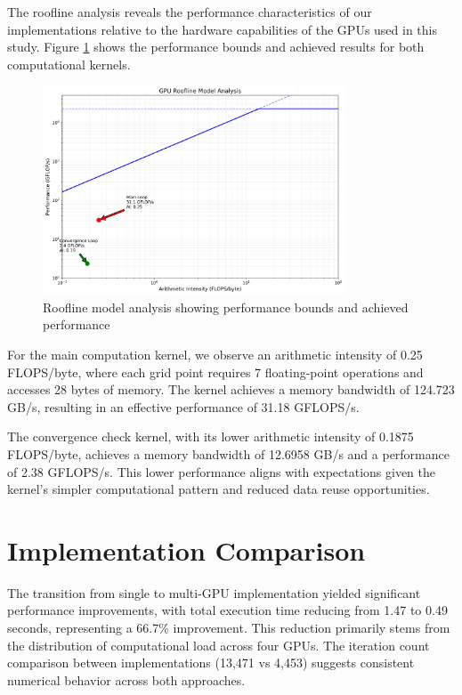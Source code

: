 \documentclass{article}
\begin{document}
The roofline analysis reveals the performance characteristics of our implementations relative to the hardware capabilities of the GPUs used in this study. Figure \ref{fig:roofline} shows the performance bounds and achieved results for both computational kernels.


\begin{figure}[H]
    \centering
    \includegraphics[width=0.8\textwidth]{gpu_roofline_model.png}
    \caption{Roofline model analysis showing performance bounds and achieved performance}
    \label{fig:roofline}
\end{figure}

For the main computation kernel, we observe an arithmetic intensity of 0.25 FLOPS/byte, where each grid point requires 7 floating-point operations and accesses 28 bytes of memory. The kernel achieves a memory bandwidth of 124.723 GB/s, resulting in an effective performance of 31.18 GFLOPS/s.

The convergence check kernel, with its lower arithmetic intensity of 0.1875 FLOPS/byte, achieves a memory bandwidth of 12.6958 GB/s and a performance of 2.38 GFLOPS/s. This lower performance aligns with expectations given the kernel's simpler computational pattern and reduced data reuse opportunities.

\section{Implementation Comparison}

The transition from single to multi-GPU implementation yielded significant performance improvements, with total execution time reducing from 1.47 to 0.49 seconds, representing a 66.7\% improvement. This reduction primarily stems from the distribution of computational load across four GPUs. The iteration count comparison between implementations (13,471 vs 4,453) suggests consistent numerical behavior across both approaches.
\end{document}
